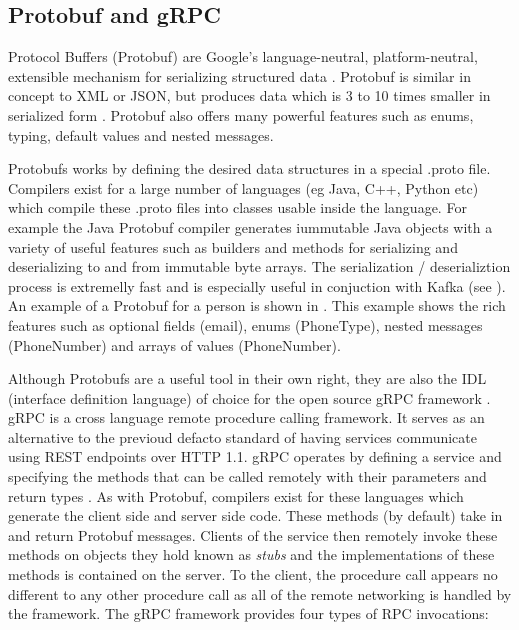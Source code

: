 \subsection{Protobuf and gRPC}
Protocol Buffers (Protobuf) are Google's language-neutral, platform-neutral, extensible mechanism for serializing structured data \cite{protobuf}. Protobuf is similar in concept to XML or JSON, but produces data which is 3 to 10 times smaller in serialized form \cite{protobufSizeStat}. Protobuf also offers many powerful features such as enums, typing, default values and nested messages.

Protobufs works by defining the desired data structures in a special .proto file. Compilers exist for a large number of languages (eg Java, C++, Python etc) which compile these .proto files into classes usable inside the language. For example the Java Protobuf compiler generates iummutable Java objects with a variety of useful features such as builders and methods for serializing and deserializing to and from immutable byte arrays. The serialization / deserializtion process is extremelly fast and is especially useful in conjuction with Kafka (see ). An example of a Protobuf for a person is shown in . This example shows the rich features such as optional fields (email), enums (PhoneType), nested messages (PhoneNumber) and arrays of values (PhoneNumber).



Although Protobufs are a useful tool in their own right, they are also the IDL (interface definition language) of choice for the open source gRPC framework \cite{gRPC}. gRPC is a cross language remote procedure calling framework. It serves as an alternative to the previoud defacto standard of having services communicate using REST endpoints over HTTP 1.1. gRPC operates by defining a service and specifying the methods that can be called remotely with their parameters and return types \cite{gRPCDef}. As with Protobuf, compilers exist for these languages which generate the client side and server side code. These methods (by default) take in and return Protobuf messages. Clients of the service then remotely invoke these methods on objects they hold known as \textit{stubs} and the implementations of these methods is contained on the server. To the client, the procedure call appears no different to any other procedure call as all of the remote networking is handled by the framework. The gRPC framework provides four types of RPC invocations:

